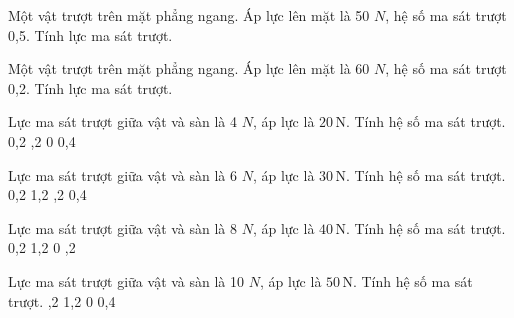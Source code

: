 \begin{bt}
Một vật trượt trên mặt phẳng ngang. Áp lực lên mặt là 50 $N$, hệ số ma sát trượt 0,5. Tính lực ma sát trượt.
\end{bt}

\begin{bt}
Một vật trượt trên mặt phẳng ngang. Áp lực lên mặt là 60 $N$, hệ số ma sát trượt 0,2. Tính lực ma sát trượt.
\end{bt}

\begin{ex}
Lực ma sát trượt giữa vật và sàn là 4 $N$, áp lực là $20\,\text{N}$. Tính hệ số ma sát trượt.
\choice
{0,2}
{,2}
{0}
{0,4}
\end{ex}

\begin{ex}
Lực ma sát trượt giữa vật và sàn là 6 $N$, áp lực là $30\,\text{N}$. Tính hệ số ma sát trượt.
\choice
{0,2}
{1,2}
{,2}
{0,4}
\end{ex}

\begin{ex}
Lực ma sát trượt giữa vật và sàn là 8 $N$, áp lực là $40\,\text{N}$. Tính hệ số ma sát trượt.
\choice
{0,2}
{1,2}
{0}
{,2}
\end{ex}

\begin{ex}
Lực ma sát trượt giữa vật và sàn là 10 $N$, áp lực là $50\,\text{N}$. Tính hệ số ma sát trượt.
\choice
{,2}
{1,2}
{0}
{0,4}
\end{ex}


